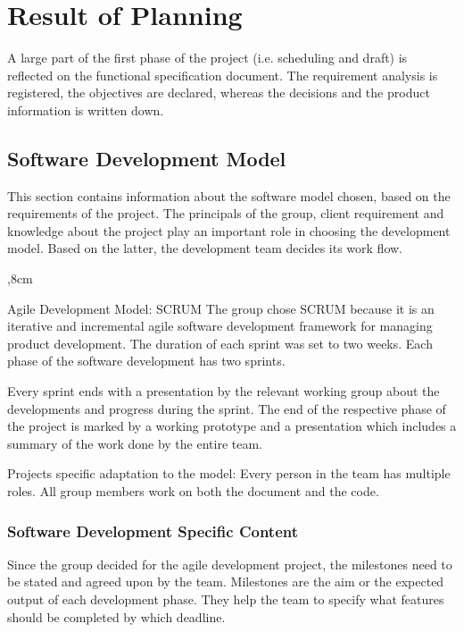 \section{Result of Planning}
A large part of the first phase of the project (i.e. scheduling and draft) is reflected on the functional specification document. The requirement analysis is registered, the objectives are declared, whereas the decisions and the product information is written down.

\subsection{Software Development Model}

This section contains information about the software model chosen, based on the requirements of the project.
The principals of the group, client requirement and knowledge about the project play an important role in choosing the development model. Based on the latter, the development team decides its work flow. 

\begin{aims}
	,8cm
	\item[Agile Development Model: SCRUM] The group chose SCRUM because it is an iterative and incremental agile software development framework for managing product development. The duration of each sprint was set to two weeks. Each phase of the software development has two sprints. 
	
	Every sprint ends with a presentation by the relevant working group about the developments and progress during the sprint. The end of the respective phase of the project is marked by a working prototype and a presentation which includes a summary of the work done by the entire team. 
	
	\item[Projects specific adaptation to the model:] Every person in the team has multiple roles. All group members work on both the document and the code.
\end{aims} 

\subsubsection{Software Development Specific Content}
Since the group decided for the agile development project, the milestones need to be stated and agreed upon by the team. Milestones are the aim or the expected output of each development phase. They help the team to specify what features should be completed by which deadline.

